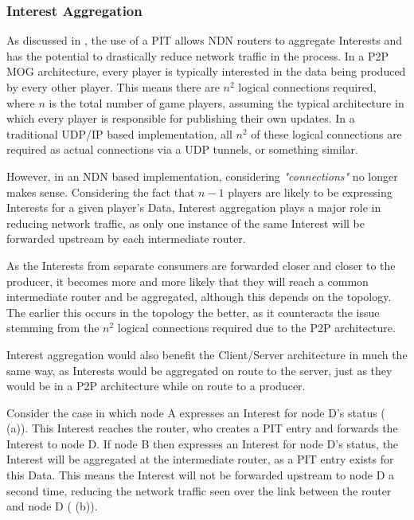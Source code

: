 \subsubsection*{Interest Aggregation}
As discussed in , the use of a PIT allows NDN routers to aggregate Interests and has the potential to drastically reduce network traffic in the process. In a P2P MOG architecture, every player is typically interested in the data being produced by every other player. This means there are $n^2$ logical connections required, where $n$ is the total number of game players, assuming the typical architecture in which every player is responsible for publishing their own updates. In a traditional UDP/IP based implementation, all $n^2$ of these logical connections are required as actual connections via a UDP tunnels, or something similar.

However, in an NDN based implementation, considering \textit{"connections"} no longer makes sense. Considering the fact that $n-1$ players are likely to be expressing Interests for a given player's Data, Interest aggregation plays a major role in reducing network traffic, as only one instance of the same Interest will be forwarded upstream by each intermediate router. 

As the Interests from separate consumers are forwarded closer and closer to the producer, it becomes more and more likely that they will reach a common intermediate router and be aggregated, although this depends on the topology. The earlier this occurs in the topology the better, as it counteracts the issue stemming from the $n^2$ logical connections required due to the P2P architecture.

Interest aggregation would also benefit the Client/Server architecture in much the same way, as Interests would be aggregated on route to the server, just as they would be in a P2P architecture while on route to a producer.

Consider the case in which node A expresses an Interest for node D's status ( (a)). This Interest reaches the router, who creates a PIT entry and forwards the Interest to node D. If node B then expresses an Interest for node D's status, the Interest will be aggregated at the intermediate router, as a PIT entry exists for this Data. This means the Interest will not be forwarded upstream to node D a second time, reducing the network traffic seen over the link between the router and node D ( (b)).



